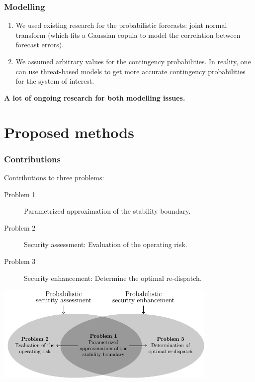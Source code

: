 \documentclass{beamer}
\begin{document}
\begin{frame}
  \frametitle{Modelling}
  \begin{enumerate}
  \item We used existing research for the probabilistic forecasts: joint normal transform (which fits a Gaussian copula to model the correlation between forecast errors).
  \item We assumed arbitrary values for the contingency probabilities. In reality, one can use threat-based models to get more accurate contingency probabilities for the system of interest.
  \end{enumerate}
\textbf{A lot of ongoing research for both modelling issues.}
\end{frame}

\section{Proposed methods}

\begin{frame}
  \frametitle{Contributions}
  Contributions to three problems:
  \begin{description}
  \item[Problem 1] Parametrized approximation of the stability boundary.
  \item[Problem 2] Security assessment: Evaluation of the operating risk.
  \item[Problem 3] Security enhancement: Determine the optimal re-dispatch.
  \end{description}
\vskip0.5cm
\centerline{\includegraphics[width=0.8\textwidth]{Figs/FrameworkContribRound-all}}
\end{frame}
\end{document}
